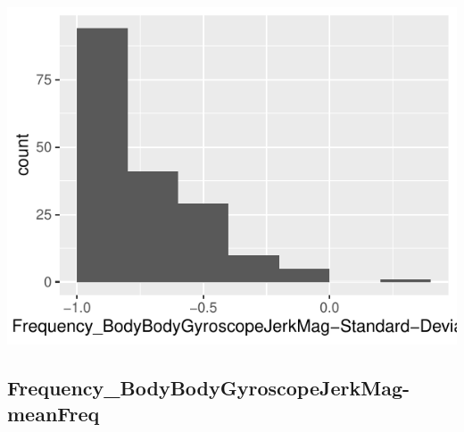 \documentclass[
]{article}
\begin{document}
\begin{minipage}{0.25 \textwidth}

\includegraphics{codebook_tidydatasub_files/figure-latex/Var-80-Frequency-BodyBodyGyroscopeJerkMag-Standard-Deviation--1.pdf}

\end{minipage}

\noindent\makebox[\linewidth]{\rule{\textwidth}{0.4pt}}

\hypertarget{frequency_bodybodygyroscopejerkmag-meanfreq}{%
\subsection{Frequency\_BodyBodyGyroscopeJerkMag-meanFreq}\label{frequency_bodybodygyroscopejerkmag-meanfreq}}
\end{document}
